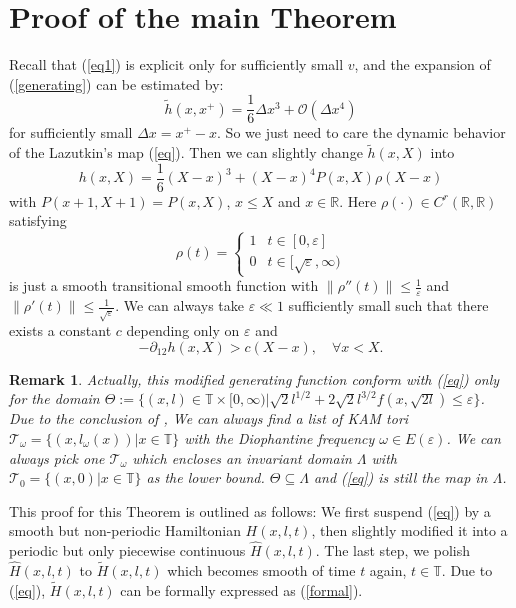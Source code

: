 \documentclass{amsart}
\newtheorem{rmk}[thm]{Remark}
\begin{document}
\section{Proof of the main Theorem}\label{2}
Recall that (\ref{eq1}) is explicit only for sufficiently small $v$, and the expansion of (\ref{generating}) can be estimated by:
\begin{equation}\label{expansion}
\tilde{h}(x,x^+)=\frac{1}{6}\Delta x^3+{\mathcal{O}}(\Delta x^4)
\end{equation}
for sufficiently small $\Delta x=x^+-x$. So we just need to care the dynamic behavior of the Lazutkin's map (\ref{eq}). Then we can slightly change $\tilde{h}(x,X)$ into 
\[
h(x,X)=\frac{1}{6}(X-x)^3+(X-x)^4P(x,X)\rho(X-x)
\]
with $P(x+1,X+1)=P(x,X)$, $x\leq X$ and $x\in{\mathbb{R}}$. Here $\rho(\cdot)\in C^r({\mathbb{R}},{\mathbb{R}})$ satisfying
\[
\rho(t)=
\begin{cases}
1 & t\in[0,{\varepsilon}]\\
0 & t\in[\sqrt{\varepsilon},\infty)
\end{cases}
\]
is just a smooth transitional smooth function with $\|\rho''(t)\|\leq\frac{1}{\varepsilon}$ and $\|\rho'(t)\|\leq\frac{1}{\sqrt{\varepsilon}}$. We can always take ${\varepsilon}\ll1$ sufficiently small such that there exists a constant $c$ depending only on ${\varepsilon}$ and 
\[
-\partial_{12}h(x,X)>c(X-x),\quad\forall x<X.
\]
\begin{rmk}
Actually, this modified generating function conform with (\ref{eq}) only for the domain $\Theta:=\{(x,l)\in{\mathbb{T}}\times[0,\infty)|\sqrt{2}l^{1/2}+2\sqrt{2}l^{3/2}f(x,\sqrt{2l})\leq{\varepsilon}\}$. Due to the conclusion of \cite{L}, We can always find a list of KAM tori $\mathcal{T}_{\omega}=\{(x,l_\omega(x))|x\in{\mathbb{T}}\}$ with the Diophantine frequency ${\omega}\in E({\varepsilon})$. We can always pick one $\mathcal{T}_{\omega}$ which encloses an invariant domain $\Lambda$ with $\mathcal{T}_0=\{(x,0)|x\in{\mathbb{T}}\}$ as the lower bound. $\Theta\subseteq\Lambda$ and (\ref{eq}) is still the map in $\Lambda$.
\end{rmk}

This proof for this Theorem is outlined as follows: We first suspend (\ref{eq}) by a smooth but non-periodic Hamiltonian $H(x,l,t)$, then slightly modified it into a periodic but only piecewise continuous $\hat{H}(x,l,t)$. The last step, we polish $\hat{H}(x,l,t)$ to $\tilde{H}(x,l,t)$ which becomes smooth of time $t$ again, $t\in{\mathbb{T}}$. Due to (\ref{eq}), $\tilde{H}(x,l,t)$ can be formally expressed as (\ref{formal}).
\end{document}
